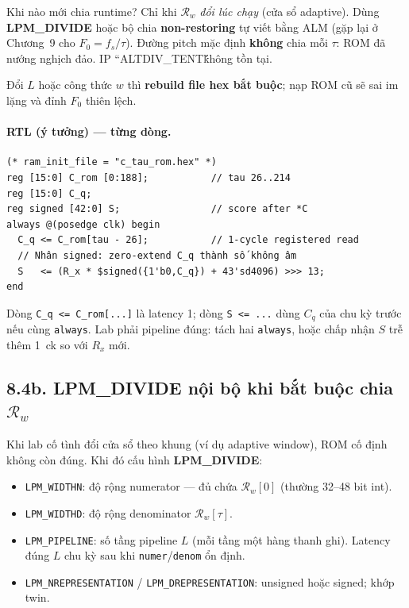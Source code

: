 Khi nào mới chia runtime? Chỉ khi $\mathcal{R}_w$ \emph{đổi lúc chạy} (cửa sổ adaptive). Dùng \textbf{LPM\_DIVIDE} hoặc bộ chia \textbf{non-restoring} tự viết bằng ALM (gặp lại ở Chương~9 cho $F_0=f_s/\tau$). Đường pitch mặc định \textbf{không} chia mỗi $\tau$: ROM đã nướng nghịch đảo. IP ``ALTDIV\_TENT\'\' không tồn tại.

Đổi $L$ hoặc công thức $w$ thì \textbf{rebuild file hex bắt buộc}; nạp ROM cũ sẽ sai im lặng và đỉnh $F_0$ thiên lệch.

\paragraph{RTL (ý tưởng) --- từng dòng.}
\begin{verbatim}
(* ram_init_file = "c_tau_rom.hex" *)
reg [15:0] C_rom [0:188];           // tau 26..214
reg [15:0] C_q;
reg signed [42:0] S;                // score after *C
always @(posedge clk) begin
  C_q <= C_rom[tau - 26];           // 1-cycle registered read
  // Nhân signed: zero-extend C_q thành số không âm
  S   <= (R_x * $signed({1'b0,C_q}) + 43'sd4096) >>> 13;
end
\end{verbatim}
Dòng \texttt{C\_q <= C\_rom[...]} là latency 1; dòng \texttt{S <= ...} dùng $C_q$ của chu kỳ trước nếu cùng \texttt{always}.
Lab phải pipeline đúng: tách hai \texttt{always}, hoặc chấp nhận $S$ trễ thêm 1~ck so với $R_x$ mới.


\subsection*{8.4b. LPM\_DIVIDE nội bộ khi bắt buộc chia $\mathcal{R}_w$}

Khi lab cố tình đổi cửa sổ theo khung (ví dụ adaptive window), ROM cố định không còn đúng. Khi đó cấu hình \textbf{LPM\_DIVIDE}:

\begin{itemize}[leftmargin=1.4em]
\item \texttt{LPM\_WIDTHN}: độ rộng numerator --- đủ chứa $\mathcal{R}_w[0]$ (thường 32--48 bit int).
\item \texttt{LPM\_WIDTHD}: độ rộng denominator $\mathcal{R}_w[\tau]$.
\item \texttt{LPM\_PIPELINE}: số tầng pipeline $L$ (mỗi tầng một hàng thanh ghi).
Latency đúng $L$ chu kỳ sau khi \texttt{numer}/\texttt{denom} ổn định.
\item \texttt{LPM\_NREPRESENTATION} / \texttt{LPM\_DREPRESENTATION}: unsigned hoặc signed; khớp twin.
\end{itemize}


